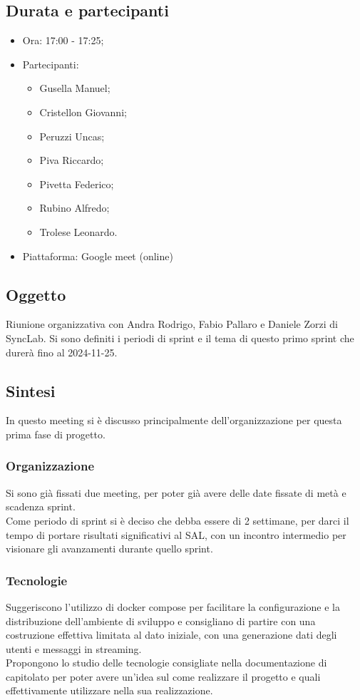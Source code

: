 \documentclass[12pt]{article}
\begin{document}
\subsection{Durata e partecipanti}
\begin{itemize}
\item Ora: 17:00 - 17:25;
\item Partecipanti: 	
	\begin{itemize}
	\item Gusella Manuel;
	\item Cristellon Giovanni;
	\item Peruzzi Uncas;
	\item Piva Riccardo;
	\item Pivetta Federico;
	\item Rubino Alfredo;
	\item Trolese Leonardo.
	\end{itemize}
\item Piattaforma: Google meet (online)
\end{itemize}
\subsection{Oggetto}
Riunione organizzativa con Andra Rodrigo, Fabio Pallaro e Daniele Zorzi di SyncLab.
Si sono definiti i periodi di sprint e il tema di questo primo sprint che durerà fino al 2024-11-25.

\subsection{Sintesi}
In questo meeting si è discusso principalmente dell'organizzazione per questa prima fase di progetto.
\subsubsection{Organizzazione}
Si sono già fissati due meeting, per poter già avere delle date fissate di metà e scadenza sprint.\\
Come periodo di sprint si è deciso che debba essere di 2 settimane, per darci il tempo di portare risultati significativi al SAL, con un incontro intermedio   per visionare gli avanzamenti durante quello sprint.

\subsubsection{Tecnologie}
Suggeriscono l'utilizzo di docker compose per facilitare la configurazione e la distribuzione dell'ambiente di sviluppo e consigliano di partire con una costruzione effettiva limitata al dato iniziale, con una generazione dati degli utenti e messaggi in streaming.\\
Propongono lo studio delle tecnologie consigliate nella documentazione di capitolato per poter avere un'idea sul come realizzare il progetto e quali effettivamente utilizzare nella sua realizzazione.
\end{document}
